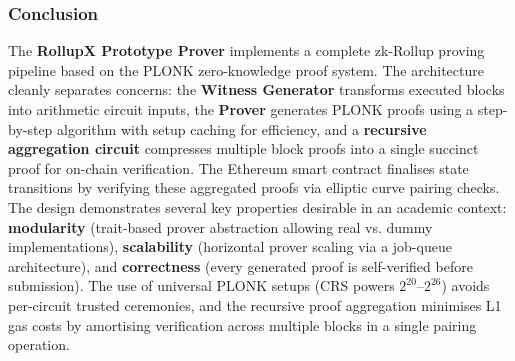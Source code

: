 \subsubsection{Conclusion} 

The \textbf{RollupX Prototype Prover} implements a complete zk-Rollup proving pipeline based on the PLONK zero-knowledge proof system. The architecture cleanly separates concerns: the \textbf{Witness Generator} transforms executed blocks into arithmetic circuit inputs, the \textbf{Prover} generates PLONK proofs using a step-by-step algorithm with setup caching for efficiency, and a \textbf{recursive aggregation circuit} compresses multiple block proofs into a single succinct proof for on-chain verification. The Ethereum smart contract finalises state transitions by verifying these aggregated proofs via elliptic curve pairing checks. \vspace{5mm} \\

The design demonstrates several key properties desirable in an academic context: \textbf{modularity} (trait-based prover abstraction allowing real vs. dummy implementations), \textbf{scalability} (horizontal prover scaling via a job-queue architecture), and \textbf{correctness} (every generated proof is self-verified before submission). The use of universal PLONK setups (CRS powers $2^{20}$--$2^{26}$) avoids per-circuit trusted ceremonies, and the recursive proof aggregation minimises L1 gas costs by amortising verification across multiple blocks in a single pairing operation.